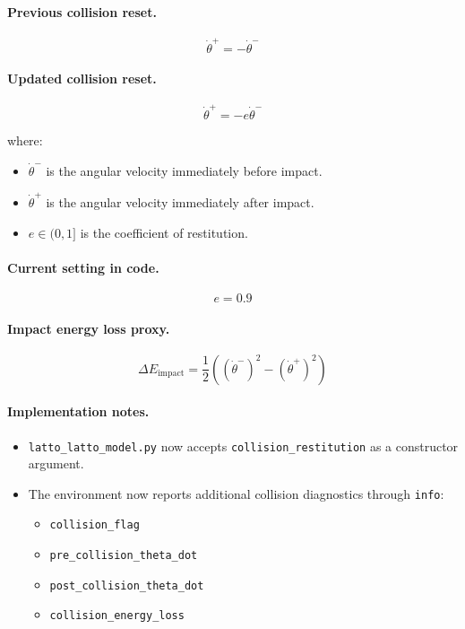 \documentclass[11pt]{article}
\begin{document}
\paragraph{Previous collision reset.}
\[
\dot{\theta}^{+} = - \dot{\theta}^{-}
\]

\paragraph{Updated collision reset.}
\[
\dot{\theta}^{+} = - e \dot{\theta}^{-}
\]

where:
\begin{itemize}[leftmargin=1.5em]
  \item $\dot{\theta}^{-}$ is the angular velocity immediately before impact.
  \item $\dot{\theta}^{+}$ is the angular velocity immediately after impact.
  \item $e \in (0, 1]$ is the coefficient of restitution.
\end{itemize}

\paragraph{Current setting in code.}
\[
e = 0.9
\]

\paragraph{Impact energy loss proxy.}
\[
\Delta E_{\mathrm{impact}}
=
\frac{1}{2}\left((\dot{\theta}^{-})^{2} - (\dot{\theta}^{+})^{2}\right)
\]

\paragraph{Implementation notes.}
\begin{itemize}[leftmargin=1.5em]
  \item \texttt{latto\_latto\_model.py} now accepts \texttt{collision\_restitution} as a constructor argument.
  \item The environment now reports additional collision diagnostics through \texttt{info}:
  \begin{itemize}[leftmargin=1.5em]
    \item \texttt{collision\_flag}
    \item \texttt{pre\_collision\_theta\_dot}
    \item \texttt{post\_collision\_theta\_dot}
    \item \texttt{collision\_energy\_loss}
  \end{itemize}
\end{itemize}
\end{document}
